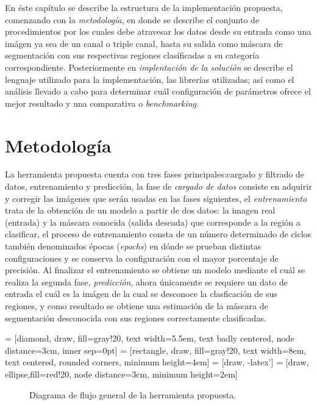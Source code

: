 En éste capítulo se describe la estructura de la implementación propuesta, comenzando con la \emph{metodología}, en donde se describe el conjunto de procedimientos por los cuales debe atravesar los datos desde su entrada como una imágen ya sea de un canal o triple canal, hasta su salida como máscara de segmentación con sus respectivas regiones clasíficadas a su categoría correspondiente. Posteriormente en \emph{implentación de la solución} se describe el lenguaje utilizado para la implementación, las librerías utilizadas; así como el análisis llevado a cabo para determinar cuál configuración de parámetros ofrece el mejor resultado y una comparativa o \emph{benchmarking}.

\section{Metodología}
La herramienta propuesta cuenta con tres fases principales:cargado y filtrado de datos, entrenamiento y predicción, la fase de \emph{cargado de datos} consiste en adquirir y corregir las imágenes que serán usadas en las fases siguientes, el \emph{entrenamiento} trata de la obtención de un modelo a partir de dos datos: la imagen real (entrada) y la máscara conocida (salida deseada) que corresponde a la región a clasificar, el proceso de entrenamiento consta de un número determinado de ciclos también denominados épocas (\emph{epochs}) en dónde se prueban distintas configuraciones y se conserva la configuración con el mayor porcentaje de precisión. Al finalizar el entrenamiento se obtiene un modelo mediante el cuál se realiza la segunda fase, \emph{predicción}, ahora únicamente se requiere un dato de entrada el cuál es la imágen de la cual se desconoce la clasficación de sus regiones, y como resultado se obtiene una estimación de la máscara de segmentación desconocida con sus regiones correctamente clasificadas.

 = [diamond, draw, fill=gray!20, 
    text width=5.5em, text badly centered, node distance=3cm, inner sep=0pt]
 = [rectangle, draw, fill=gray!20, 
    text width=8em, text centered, rounded corners, minimum height=4em]
 = [draw, -latex']
 = [draw, ellipse,fill=red!20, node distance=3cm,
    minimum height=2em]

\begin{figure}[b]
\centering    
{}
\caption{Diagrama de flujo general de la herramienta propuesta.}
\end{figure}


